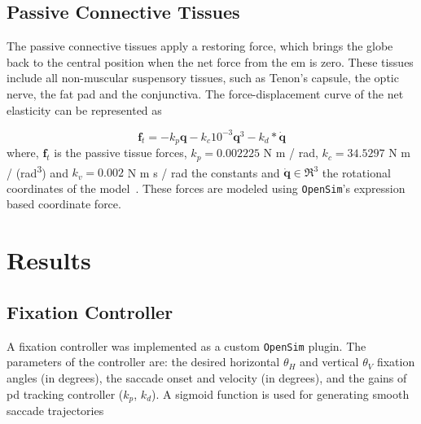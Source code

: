 \documentclass[11pt,a4paper,draft=false]{report}
\renewcommand*{\vec}[1]{\bm{#1}}
\newcommand{\R}[1]{\mathfrak{R}^{#1}}
\newcommand{\inr}[1]{\in\R{#1}}
\begin{document}
\subsection*{Passive Connective Tissues}\label{sec:passive-connective-tissues}

The passive connective tissues apply a restoring force, which brings the globe
back to the central position when the net force from the \gls{em} is zero. These
tissues include all non-muscular suspensory tissues, such as Tenon’s capsule,
the optic nerve, the fat pad and the conjunctiva. The force-displacement curve
of the net elasticity can be represented as

\begin{equation}\label{equ:passive-tissue}
  \vec{f}_t = -k_p \vec{q} - k_c 10^{-3} \vec{q}^3 - k_d * \vec{\dot{q}}
\end{equation}
% 
where, $\vec{f}_t$ is the passive tissue forces, $k_p= 0.002225$ N m / rad,
$k_c= 34.5297$ N m / (rad\textsuperscript{3}) and $k_v= 0.002$ N m s / rad the
constants and $\vec{\dot{q}} \inr{3}$ the rotational coordinates of the
model~\cite{Collins1981}. These forces are modeled using \texttt{OpenSim}'s
expression based coordinate force.


\section*{Results}\label{sec:results}

\subsection*{Fixation Controller}\label{sec:fixation-controller}

A fixation controller was implemented as a custom \texttt{OpenSim} plugin. The
parameters of the controller are: the desired horizontal $\theta_H$ and vertical
$\theta_V$ fixation angles (in degrees), the saccade onset and velocity (in
degrees), and the gains of \gls{pd} tracking controller ($k_p$, $k_d $). A
sigmoid function is used for generating smooth saccade trajectories
\end{document}
